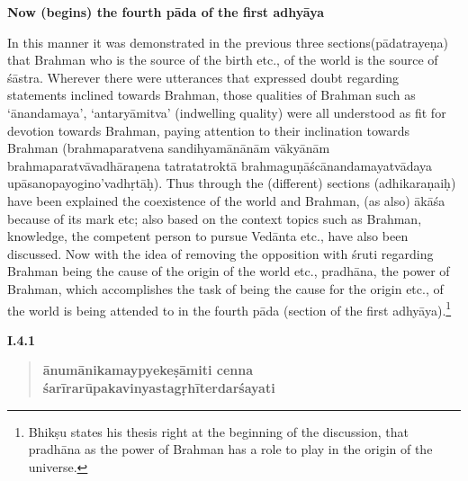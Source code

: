 

\textbf{Now (begins) the fourth pāda of the first adhyāya}

In this manner it was demonstrated in the previous three sections\break (pādatrayeṇa) that Brahman who is the source of the birth etc., of the world is the source of śāstra.  Wherever there were utterances that expressed doubt regarding statements inclined towards Brahman, those qualities of Brahman such as ‘ānandamaya’, ‘antaryāmitva’ (indwelling quality) were all understood as fit for devotion towards Brahman, paying attention to their  inclination towards Brahman (brahmaparatvena sandihyamānānām vākyānām brahmaparatvāvadhāraṇena tatra\break tatroktā brahmaguṇāścānandamayatvādaya upāsanopayogino’\-vadhṛ\-tāḥ). Thus through the (different) sections (adhikaraṇaiḥ) have been explained the coexistence of the world and Brahman, (as also) ākāśa because of its mark etc; also based on the context topics such as Brahman, knowledge, the competent person to pursue Vedānta etc., have also been discussed. Now with the idea of removing the opposition with śruti regarding Brahman being the cause of the origin of the world etc., pradhāna, the power of Brahman, which accomplishes the task of being the cause for the origin etc., of the world is being attended to in the fourth pāda (section of the first adhyāya).\footnote{Bhikṣu states his thesis right at the beginning of the discussion, that pradhāna as the power of Brahman has a role to play in the origin of the universe.}

\textbf{I.4.1}
 
\begin{verse}
\textbf{ānumānikamaypyekeṣāmiti cenna} \\
\textbf{śarīrarūpakavinyastagṛhīterdarśayati}
\end{verse}

